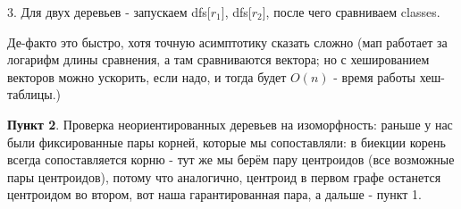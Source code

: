 

3. Для двух деревьев - запускаем dfs[$r_1$], dfs[$r_2$], после чего сравниваем classes. 

Де-факто это быстро, хотя точную асимптотику сказать сложно (мап работает за логарифм длины сравнения, а там сравниваются вектора; но с хешированием векторов можно ускорить, если надо, и тогда будет $O(n)$ - время работы хеш-таблицы.)

\textbf{Пункт 2}. Проверка неориентированных деревьев на изоморфность: раньше у нас были фиксированные пары корней, которые мы сопоставляли: в биекции корень всегда сопоставляется корню - тут же мы берём пару центроидов (все возможные пары центроидов), потому что аналогично, центроид в первом графе останется центроидом во втором, вот наша гарантированная пара, а дальше - пункт 1. 